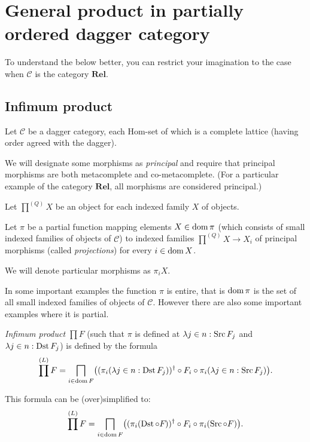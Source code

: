 \section{General product in partially ordered dagger category}

To understand the below better, you can restrict your imagination to the case
when $\mathcal{C}$ is the category $\mathbf{Rel}$.

\subsection{Infimum product}

Let $\mathcal{C}$ be a dagger category, each Hom-set of which is a complete
lattice (having order agreed with the dagger).

We will designate some morphisms as \emph{principal} and require that
principal morphisms are both metacomplete and co-metacomplete. (For a
particular example of the category $\mathbf{Rel}$, all morphisms are
considered principal.)

Let $\prod^{(Q)} X$ be an object for each indexed family $X$ of objects.

Let $\pi$ be a partial function mapping elements $X \in \operatorname{dom} \pi$ (which
consists of small indexed families of objects of $\mathcal{C}$) to indexed
families $\prod^{(Q)} X \rightarrow X_i$ of principal morphisms (called
\emph{projections}) for every $i \in \operatorname{dom} X$.

We will denote particular morphisms as $\pi_i X$.

\begin{rem}
  In some important examples the function $\pi$ is entire, that is $\operatorname{dom}
  \pi$ is the set of all small indexed families of objects of $\mathcal{C}$.
  However there are also some important examples where it is partial.
\end{rem}

\begin{defn}
  \emph{Infimum product} $\prod F$ (such that $\pi$ is defined at $\lambda
  j \in n : \operatorname{Src} F_j$ and $\lambda j \in n : \operatorname{Dst} F_j$) is defined
  by the formula
  \[ \prod^{(L)} F = \bigsqcap_{i \in \operatorname{dom} F} \bigl((\pi_i(\lambda j \in n :
     \operatorname{Dst} F_j))^{\dagger} \circ F_i \circ \pi_i(\lambda j \in n :
     \operatorname{Src} F_j)\bigr) . \]
\end{defn}

This formula can be (over)simplified to:
\[ \prod^{(L)} F = \bigsqcap_{i \in \operatorname{dom} F} \bigl((\pi_i(\operatorname{Dst} \circ
   F_{}))^{\dagger} \circ F_i \circ \pi_i(\operatorname{Src} \circ F)\bigr) . \]

